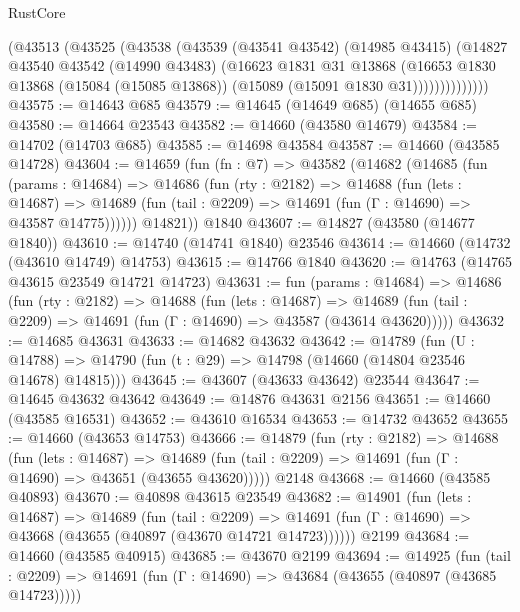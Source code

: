 \begin{lexlean}{RustCore}
\begin{coremodule}
              (@43513
                (@43525
                  (@43538
                    (@43539
                      (@43541 @43542)
                      (@14985 @43415)
                      (@14827
                        @43540
                        @43542
                        (@14990 @43483)
                        (@16623
                          @1831
                          @31
                          @13868
                          (@16653
                            @1830
                            @13868
                            (@15084 (@15085 @13868))
                            (@15089 (@15091 @1830 @31))))))))))))))
@43575 := @14643 @685
@43579 := @14645 (@14649 @685) (@14655 @685)
@43580 := @14664 @23543
@43582 := @14660 (@43580 @14679)
@43584 := @14702 (@14703 @685)
@43585 := @14698 @43584
@43587 := @14660 (@43585 @14728)
@43604 := @14659
    (fun (fn : @7) =>
    @43582
      (@14682
        (@14685
          (fun (params : @14684) =>
          @14686
            (fun (rty : @2182) =>
            @14688
              (fun (lets : @14687) =>
              @14689 (fun (tail : @2209) => @14691 (fun (Γ : @14690) => @43587 @14775))))))
        @14821))
    @1840
@43607 := @14827 (@43580 (@14677 @1840))
@43610 := @14740 (@14741 @1840) @23546
@43614 := @14660 (@14732 (@43610 @14749) @14753)
@43615 := @14766 @1840
@43620 := @14763 (@14765 @43615 @23549 @14721 @14723)
@43631 := fun (params : @14684) =>
  @14686
    (fun (rty : @2182) =>
    @14688
      (fun (lets : @14687) =>
      @14689 (fun (tail : @2209) => @14691 (fun (Γ : @14690) => @43587 (@43614 @43620)))))
@43632 := @14685 @43631
@43633 := @14682 @43632
@43642 := @14789
    (fun (U : @14788) => @14790 (fun (t : @29) => @14798 (@14660 (@14804 @23546 @14678) @14815)))
@43645 := @43607 (@43633 @43642) @23544
@43647 := @14645 @43632 @43642
@43649 := @14876 @43631 @2156
@43651 := @14660 (@43585 @16531)
@43652 := @43610 @16534
@43653 := @14732 @43652
@43655 := @14660 (@43653 @14753)
@43666 := @14879
    (fun (rty : @2182) =>
    @14688
      (fun (lets : @14687) =>
      @14689 (fun (tail : @2209) => @14691 (fun (Γ : @14690) => @43651 (@43655 @43620)))))
    @2148
@43668 := @14660 (@43585 @40893)
@43670 := @40898 @43615 @23549
@43682 := @14901
    (fun (lets : @14687) =>
    @14689
      (fun (tail : @2209) =>
      @14691 (fun (Γ : @14690) => @43668 (@43655 (@40897 (@43670 @14721 @14723))))))
    @2199
@43684 := @14660 (@43585 @40915)
@43685 := @43670 @2199
@43694 := @14925
    (fun (tail : @2209) => @14691 (fun (Γ : @14690) => @43684 (@43655 (@40897 (@43685 @14723)))))

\end{coremodule}
\end{lexlean}
